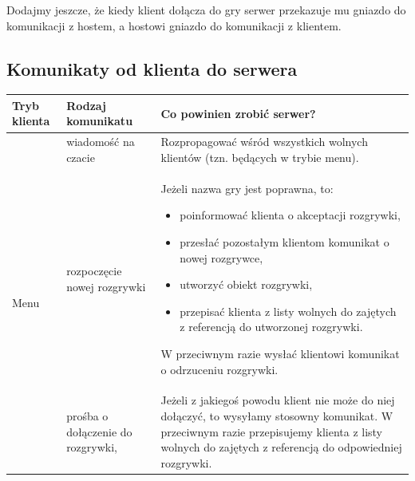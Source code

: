 \documentclass[a4paper, 12pt]{article}
\begin{document}

Dodajmy jeszcze, że kiedy klient dołącza do gry serwer przekazuje mu gniazdo do komunikacji z hostem, a hostowi gniazdo do komunikacji z klientem. 

\subsection{Komunikaty od klienta do serwera}

\begin{center}
 \begin{tabular}{p{1.3cm}||p{3.5cm}||p{9cm}}
 \hbox{Tryb} klienta& Rodzaj komunikatu & Co powinien zrobić serwer?\\ \hline \hline
\multirow{3}{*}{Menu}
  & wiadomość na czacie
  & Rozpropagować wśród wszystkich wolnych klientów (tzn. będących w trybie menu). \\ \cline{2-3}

  & rozpoczęcie nowej rozgrywki
  & Jeżeli nazwa gry jest poprawna\footnotemark, to:
      \begin{itemize}
      \item poinformować klienta o akceptacji rozgrywki,
      \item przesłać pozostałym klientom komunikat o nowej rozgrywce,
      \item utworzyć obiekt rozgrywki,
      \item przepisać klienta z listy wolnych do zajętych z referencją do utworzonej rozgrywki.
      \end{itemize}
    W przeciwnym razie wysłać klientowi komunikat o odrzuceniu rozgrywki. \\ \cline{2-3}

  & prośba o dołączenie do rozgrywki,
  & Jeżeli z jakiegoś powodu klient nie może do niej dołączyć, to wysyłamy stosowny komunikat. W przeciwnym razie przepisujemy klienta z listy wolnych do zajętych z referencją do odpowiedniej rozgrywki.\\ \hline
\end{tabular}
\end{center}
\end{document}
